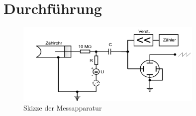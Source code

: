 \section{Durchführung}
\label{sec:Durchführung}

\begin{figure}
	\centering
	\includegraphics[width=0.8\textwidth]{content/aufbau.png}
	\caption{Skizze der Messapparatur \cite{sample}}
	\label{fig:aufbau}
\end{figure}
